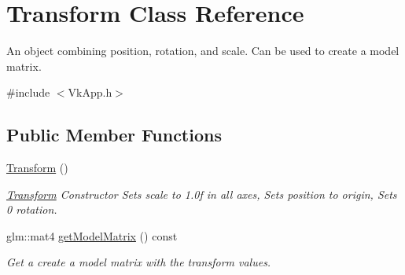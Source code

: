 \hypertarget{class_transform}{}\section{Transform Class Reference}
\label{class_transform}


An object combining position, rotation, and scale. Can be used to create a model matrix.  




{\ttfamily \#include $<$Vk\+App.\+h$>$}

\subsection*{Public Member Functions}
\begin{DoxyCompactItemize}
\item 
\mbox{\label{class_transform_aa08ca4266efabc768973cdeea51945ab}} 
\mbox{\hyperlink{class_transform_aa08ca4266efabc768973cdeea51945ab}{Transform}} ()
\begin{DoxyCompactList}\small\item\em \mbox{\hyperlink{class_transform}{Transform}} Constructor Sets scale to 1.\+0f in all axes, Sets position to origin, Sets 0 rotation. \end{DoxyCompactList}\item 
\mbox{\label{class_transform_ac37878cfeb4d0c0fb9029578e7db3ca1}} 
glm\+::mat4 \mbox{\hyperlink{class_transform_ac37878cfeb4d0c0fb9029578e7db3ca1}{get\+Model\+Matrix}} () const
\begin{DoxyCompactList}\small\item\em Get a create a model matrix with the transform values. \end{DoxyCompactList}\end{DoxyCompactItemize}
